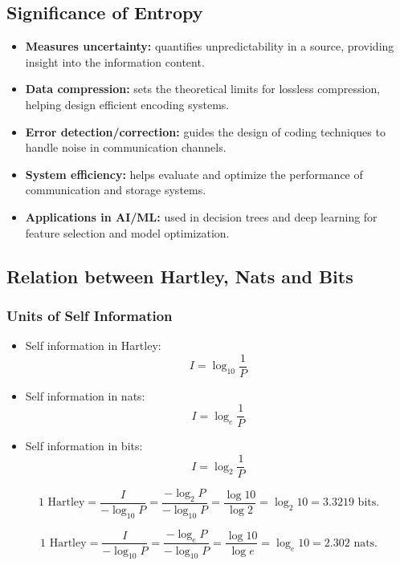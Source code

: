 \documentclass[11pt,a4paper]{book}
\newenvironment{formulabox}[1][Formula]{%
    \begin{tcolorbox}[
        enhanced,
        breakable,
        colback=softcoral!10,
        colframe=softcoral!200,
        title=#1,
        fonttitle=\bfseries,
        coltitle=white,
        sharp corners,
        boxrule=1pt,
        left=8pt,
        right=8pt,
        top=6pt,
        bottom=6pt
    ]
}{\end{tcolorbox}}
\begin{document}
\clearpage

\subsection{Significance of Entropy}

\begin{itemize}
    \item \textbf{Measures uncertainty:} quantifies unpredictability in a source, providing insight into the information content.
    \item \textbf{Data compression:} sets the theoretical limits for lossless compression, helping design efficient encoding systems.
    \item \textbf{Error detection/correction:} guides the design of coding techniques to handle noise in communication channels.
    \item \textbf{System efficiency:} helps evaluate and optimize the performance of communication and storage systems.
    \item \textbf{Applications in AI/ML:} used in decision trees and deep learning for feature selection and model optimization.
\end{itemize}

\subsection{Relation between Hartley, Nats and Bits}

\subsubsection{Units of Self Information}
\begin{itemize}
    \item Self information in Hartley:
    \[
    I = \log_{10}\frac{1}{P}
    \]
    \item Self information in nats:
    \[
    I = \log_e \frac{1}{P}
    \]
    \item Self information in bits:
    \[
    I = \log_2 \frac{1}{P}
    \]
\end{itemize}

\begin{formulabox}[Hartley to Bits]
\[
1 \text{ Hartley}
= \frac{I}{-\log_{10} P}
= \frac{-\log_2 P}{-\log_{10} P}
= \frac{\log 10}{\log 2}
= \log_2 10
= 3.3219 \text{ bits.}
\]
\end{formulabox}

\begin{formulabox}[Hartley to Nats]
\[
1 \text{ Hartley}
= \frac{I}{-\log_{10} P}
= \frac{-\log_e P}{-\log_{10} P}
= \frac{\log 10}{\log e}
= \log_e 10
= 2.302 \text{ nats.}
\]
\end{formulabox}
\end{document}
